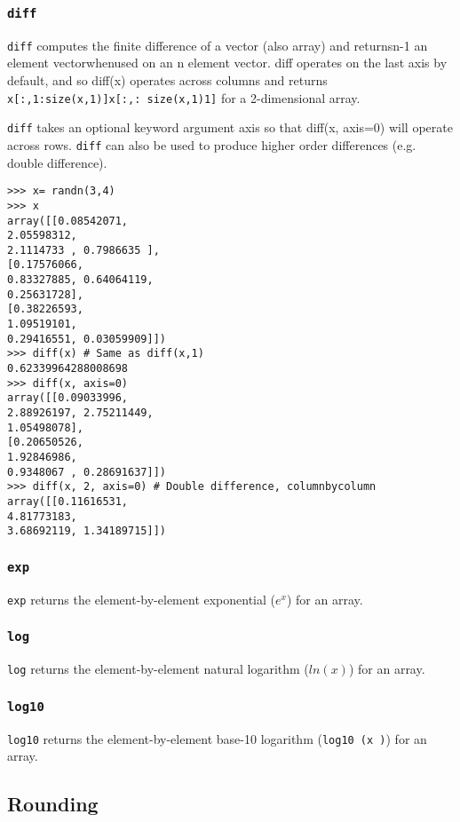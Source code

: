 \documentclass[KSmain.tex]{subfiles}
\begin{document}
\subsubsection*{\texttt{diff}}
\texttt{diff} computes the finite difference of a vector (also array) and returnsn-1 an element vectorwhenused on
an n element vector. diff operates on the last axis by default, and so diff(x) operates across columns and
returns \texttt{x[:,1:size(x,1)]x[:,:
size(x,1)1]}
for a 2-dimensional array. 

\texttt{diff} takes an optional keyword argument axis so that diff(x, axis=0) will operate across rows. \texttt{diff} can also be used to produce higher
order differences (e.g. double difference).
\begin{framed}
\begin{verbatim}>>> x= randn(3,4)
>>> x
array([[0.08542071,
2.05598312,
2.1114733 , 0.7986635 ],
[0.17576066,
0.83327885, 0.64064119,
0.25631728],
[0.38226593,
1.09519101,
0.29416551, 0.03059909]])
>>> diff(x) # Same as diff(x,1)
0.62339964288008698
>>> diff(x, axis=0)
array([[0.09033996,
2.88926197, 2.75211449,
1.05498078],
[0.20650526,
1.92846986,
0.9348067 , 0.28691637]])
>>> diff(x, 2, axis=0) # Double difference, columnbycolumn
array([[0.11616531,
4.81773183,
3.68692119, 1.34189715]])
\end{verbatim}
\end{framed}
\subsubsection*{\texttt{exp}}
\texttt{exp} returns the element-by-element exponential ($e^x$) for an array.
\subsubsection*{\texttt{log}}
\texttt{log} returns the element-by-element natural logarithm ($ln(x )$) for an array.
\subsubsection*{\texttt{log10}}
\texttt{log10} returns the element-by-element base-10 logarithm (\texttt{log10 (x )}) for an array.

\subsection{Rounding}
\end{document}
